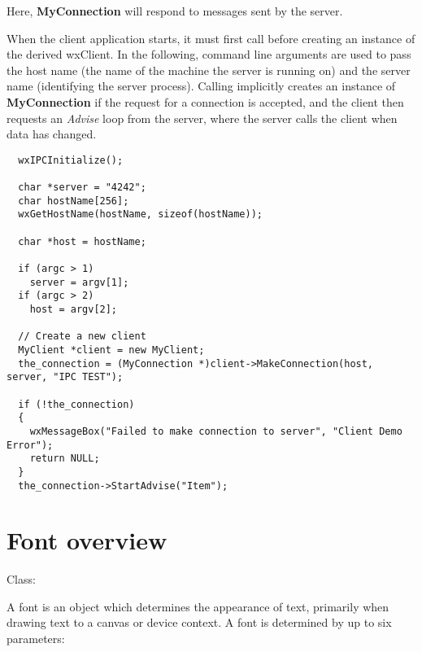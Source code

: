 Here, {\bf MyConnection} will respond to  messages sent
by the server.

When the client application starts, it must first call \rtfsp
before creating an instance of the derived wxClient. In the following, command line
arguments are used to pass the host name (the name of the machine the server is running
on) and the server name (identifying the server process). Calling \rtfsp
implicitly creates an instance of {\bf MyConnection} if the request for a
connection is accepted, and the client then requests an {\it Advise} loop
from the server, where the server calls the client when data has changed.

\begin{verbatim}
  wxIPCInitialize();

  char *server = "4242";
  char hostName[256];
  wxGetHostName(hostName, sizeof(hostName));

  char *host = hostName;

  if (argc > 1)
    server = argv[1];
  if (argc > 2)
    host = argv[2];

  // Create a new client
  MyClient *client = new MyClient;
  the_connection = (MyConnection *)client->MakeConnection(host, server, "IPC TEST");

  if (!the_connection)
  {
    wxMessageBox("Failed to make connection to server", "Client Demo Error");
    return NULL;
  }
  the_connection->StartAdvise("Item");
\end{verbatim}

\section{Font overview}\label{wxfontoverview}

Class: 

A font is an object which determines the appearance of text, primarily
when drawing text to a canvas or device context. A font is determined by
up to six parameters:

\begin{twocollist}\itemsep=0pt
\end{twocollist}


